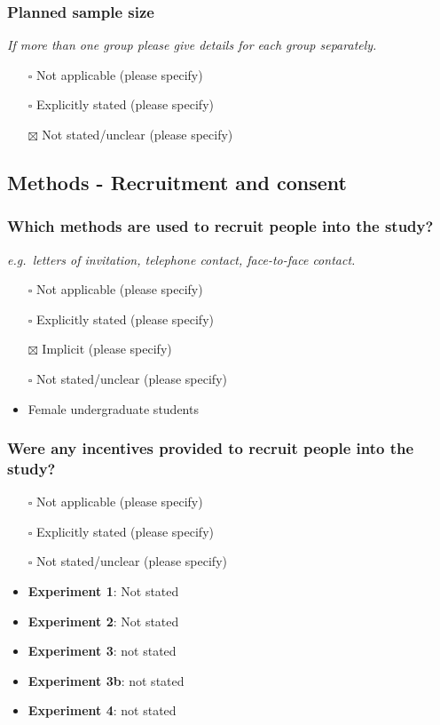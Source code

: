 \documentclass[
  doc, a4paper]{apa7}
\providecommand{\tightlist}{%
  \setlength{\itemsep}{0pt}\setlength{\parskip}{0pt}}
\begin{document}
\subsubsection{Planned sample size}\label{planned-sample-size}

\emph{If more than one group please give details for each group separately.}

\begin{itemize}
\tightlist
\item[$\square$]
  Not applicable (please specify)
\item[$\square$]
  Explicitly stated (please specify)
\item[$\boxtimes$]
  Not stated/unclear (please specify)
\end{itemize}

\subsection{Methods - Recruitment and consent}\label{methods---recruitment-and-consent}

\subsubsection{Which methods are used to recruit people into the study?}\label{which-methods-are-used-to-recruit-people-into-the-study}

\emph{e.g.~letters of invitation, telephone contact, face-to-face contact.}

\begin{itemize}
\item[$\square$]
  Not applicable (please specify)
\item[$\square$]
  Explicitly stated (please specify)
\item[$\boxtimes$]
  Implicit (please specify)
\item[$\square$]
  Not stated/unclear (please specify)
\item
  Female undergraduate students
\end{itemize}

\subsubsection{Were any incentives provided to recruit people into the study?}\label{were-any-incentives-provided-to-recruit-people-into-the-study}

\begin{itemize}
\item[$\square$]
  Not applicable (please specify)
\item[$\square$]
  Explicitly stated (please specify)
\item[$\square$]
  Not stated/unclear (please specify)
\item
  \textbf{Experiment 1}: Not stated\\
\item
  \textbf{Experiment 2}: Not stated
\item
  \textbf{Experiment 3}: not stated
\item
  \textbf{Experiment 3b}: not stated
\item
  \textbf{Experiment 4}: not stated
\end{itemize}
\end{document}
